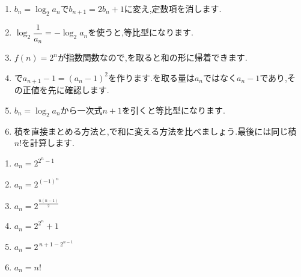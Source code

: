   \noindent{}\par\nobreak
  \begin{enumerate}[label=(\arabic*),parsep=3pt,format=\bookitemlink{example-logarithmic-1}{hint}{problem}]
    \item $b_n=\log_2a_n$で$b_{n+1}=2b_n+1$に変え,定数項を消します.
    \item $\log_2\dfrac{1}{a_n}=-\log_2a_n$を使うと,等比型になります.
    \item $f(n)=2^n$が指数関数なので,を取ると和の形に帰着できます.
    \item {}で$a_{n+1}-1=(a_n-1)^2$を作ります.を取る量は$a_n$ではなく$a_n-1$であり,その正値を先に確認します.
    \item $b_n=\log_2a_n$から一次式$n+1$を引くと等比型になります.
    \item 積を直接まとめる方法と,で和に変える方法を比べましょう.最後には同じ積$n!$を計算します.
  \end{enumerate}

  \noindent{}\par\nobreak
  \begin{enumerate}[label=(\arabic*),parsep=3pt,format=\bookitemlink{example-logarithmic-1}{answer}{problem}]
    \item $\displaystyle a_n=2^{2^{n}-1}$
    \item $a_n=2^{(-1)^{n}}$
    \item $a_n=2^{\frac{n(n-1)}{2}}$
    \item $a_n=2^{2^n}+1$
    \item $\displaystyle a_n=2^{\,n+1-2^{n-1}}$
    \item $a_n=n!$
  \end{enumerate}

  \noindent{}\par\nobreak

